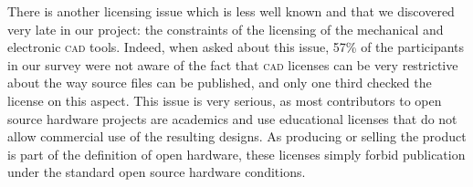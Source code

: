 \documentclass[letterpaper, 10 pt, conference]{ieeeconf}  %
\begin{document}
There is another licensing issue which is less well known and that we discovered very late in our project: the constraints of the licensing of the mechanical and electronic \textsc{cad} tools. 
Indeed, when asked about this issue, 57\% of the participants in our survey were not aware of the fact that \textsc{cad} licenses can be very restrictive about the way source files can be published, and only one third checked the license on this aspect. 
This issue is very serious, as most contributors to open source hardware projects are academics and use educational licenses that do not allow commercial use of the resulting designs. 
As producing or selling the product is part of the definition of open hardware, these licenses simply forbid publication under the standard open source hardware conditions. 
\end{document}
